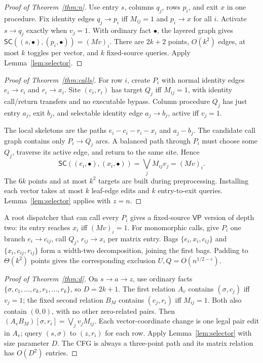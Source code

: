 \documentclass[11pt,letterpaper]{article}
\theoremstyle{definition}
\newcommand{\SC}{\mathsf{SC}}
\newcommand{\VP}{\mathsf{VP}}
\begin{document}
\begin{proof}[Proof of Theorem~\ref{thm:n}]
Use entry $s$, columns $q_j$, rows $p_i$, and exit $x$ in one procedure.
Fix identity edges $q_j\to p_i$ iff $M_{ij}=1$ and $p_i\to x$ for
all $i$. Activate $s\to q_j$ exactly when $v_j=1$. With ordinary fact
$\bullet$, the layered graph gives
$\SC((s,\bullet),(p_i,\bullet))=(Mv)_i$. There are $2k+2$ points,
$O(k^2)$ edges, at most $k$ toggles per vector, and $k$ fixed-source
queries. Apply Lemma~\ref{lem:selector}.
\end{proof}

\begin{proof}[Proof of Theorem~\ref{thm:calls}]
For row $i$, create $P_i$ with normal identity edges $e_i\to c_i$ and
$r_i\to x_i$. Site $(c_i,r_i)$ has target $Q_j$ iff $M_{ij}=1$,
with identity call/return transfers and no executable bypass. Column
procedure $Q_j$ has just entry $a_j$, exit $b_j$, and selectable identity
edge $a_j\to b_j$, active iff $v_j=1$.

The local skeletons are the paths $e_i-c_i-r_i-x_i$ and $a_j-b_j$.
The candidate call graph contains only $P_i\to Q_j$ arcs. A balanced
path through $P_i$ must choose some $Q_j$, traverse its active edge,
and return to the same site. Hence
\[
 \SC((e_i,\bullet),(x_i,\bullet))=\bigvee_j M_{ij}v_j=(Mv)_i.
\]
The $6k$ points and at most $k^2$ targets are built during preprocessing.
Installing each vector takes at most $k$ leaf-edge edits and $k$
entry-to-exit queries. Lemma~\ref{lem:selector} applies with $z=n$.
\end{proof}



A root dispatcher that can call every $P_i$ gives a fixed-source $\VP$
version of depth two: its entry reaches $x_i$ iff $(Mv)_i=1$.
For monomorphic calls, give $P_i$ one branch
$e_i\to c_{ij}$, call $Q_j$, $r_{ij}\to x_i$ per matrix entry.
Bags $\{e_i,x_i,c_{ij}\}$ and $\{x_i,c_{ij},r_{ij}\}$ form a
width-two decomposition, joining the first bags. Padding to $\Theta(k^2)$
points gives the corresponding exclusion $U,Q=O(n^{1/2-\varepsilon})$.

\begin{proof}[Proof of Theorem~\ref{thm:d}]
On $s\to a\to z$, use ordinary facts
$\{\sigma,c_1,\ldots,c_k,r_1,\ldots,r_k\}$, so $D=2k+1$.
The first relation $A_v$ contains $(\sigma,c_j)$ iff $v_j=1$; the
fixed second relation $B_M$ contains $(c_j,r_i)$ iff $M_{ij}=1$.
Both also contain $(0,0)$, with no other zero-related pairs. Then
$(A_vB_M)[\sigma,r_i]=\bigvee_j v_jM_{ij}$.
Each vector-coordinate change is one legal pair edit in $A_v$;
query $(s,\sigma)$ to $(z,r_i)$ for each row. Apply
Lemma~\ref{lem:selector} with size parameter $D$. The CFG is always a
three-point path and its matrix relation has $O(D^2)$ entries.
\end{proof}
\end{document}
